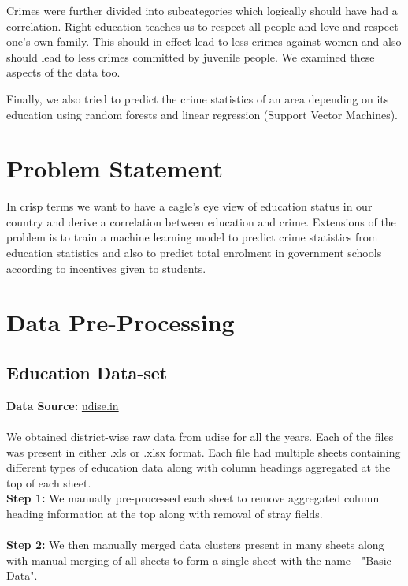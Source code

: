 \documentclass[twoside]{article}
\begin{document}
Crimes were further divided into subcategories which logically should have had a correlation. Right education teaches us to respect all people and love and respect one's own family. This should in effect lead to less crimes against women and also should lead to less crimes committed by juvenile people. We examined these aspects of the data too.

Finally, we also tried to predict the crime statistics of an area depending on its education using random forests and linear regression (Support Vector Machines).

\vspace*{-0.6cm}

\section*{Problem Statement}

\vspace*{-0.4cm}
In crisp terms we want to have a eagle's eye view of education status in our country and derive a correlation between education and crime. Extensions of the problem is to train a machine learning model to predict crime statistics from education statistics and also to predict total enrolment in government schools according to incentives given to students.
\vspace*{-0.6cm}
\section*{Data Pre-Processing}
\vspace*{-0.4cm}
\subsection*{Education Data-set}
\textbf{Data Source:} \href{http://udise.in/drc.htm}{udise.in}\\
\\
We obtained district-wise raw data from udise for all the years. Each of the files was present in either .xls or .xlsx format. Each file had multiple sheets containing different types of education data along with column headings aggregated at the top of each sheet.\\

\textbf{Step 1:} We manually pre-processed each sheet to remove aggregated column heading information at the top along with removal of stray fields.\\\\
\textbf{Step 2:} We then manually merged  data clusters present in many sheets along with manual merging of all sheets to form a single sheet with the name - "Basic Data".
\end{document}
